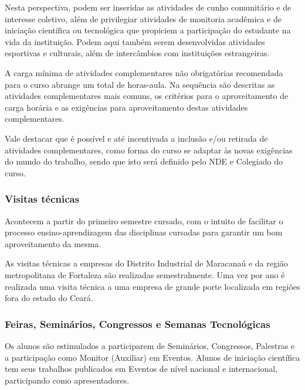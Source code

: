 \documentclass{paper}
\begin{document}
Nesta perspectiva, podem ser inseridas as atividades de cunho comunitário e de interesse coletivo, além de privilegiar atividades de monitoria acadêmica e de iniciação científica ou tecnológica que propiciem a participação do estudante na vida da instituição. Podem aqui também serem desenvolvidas atividades esportivas e culturais, além de intercâmbios com instituições estrangeiras.


A carga mínima de atividades complementares não obrigatórias recomendada para o curso abrange um total de \CHCOMP horas-aula. Na sequência são descritas as atividades complementares mais comuns, os critérios para o aproveitamento de carga horária e as exigências para aproveitamento destas atividades complementares. 

Vale destacar que é possível e até incentivada a inclusão e/ou retirada de atividades complementares, como forma do curso se adaptar às novas exigências do mundo do trabalho, sendo que isto será definido pelo NDE e Colegiado do curso.

\subsubsection{Visitas técnicas}

Acontecem a partir do primeiro semestre cursado, com o intuito de facilitar o processo ensino-aprendizagem das
disciplinas cursadas para garantir um bom aproveitamento da mesma.

As visitas técnicas a empresas do Distrito Industrial de Maracanaú e da região metropolitana de Fortaleza são realizadas semestralmente. Uma vez por ano é realizada uma visita técnica a uma empresa de grande porte localizada em regiões fora do estado do Ceará.

\subsubsection{Feiras, Seminários, Congressos e Semanas Tecnológicas}

Os alunos são estimulados a participarem de Seminários, Congressos, Palestras e a participação como Monitor (Auxiliar) em Eventos. Alunos de iniciação científica tem seus trabalhos publicados em Eventos de nível nacional e internacional, participando como apresentadores.
\end{document}
